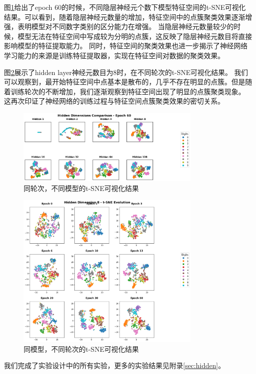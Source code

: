 \documentclass[12pt,a4paper]{article}
\begin{document}
图\ref{fig:60}给出了epoch 60的时候，不同隐层神经元个数下模型特征空间的t-SNE可视化结果。可以看到，随着隐层神经元数量的增加，特征空间中的点簇聚类效果逐渐增强，表明模型对不同数字类别的区分能力在增强。
当隐层神经元数量较少的时候，模型无法在特征空间中写成较为分明的点簇，这反映了隐层神经元数目将直接影响模型的特征提取能力。
同时，特征空间的聚类效果也进一步揭示了神经网络学习能力的来源是训练特征提取器，实现在特征空间对数据的聚类效果。

图\ref{fig:8}展示了hidden layer神经元数目为8时，在不同轮次的t-SNE可视化结果。
我们可以观察到，最开始特征空间中点基本是散布的，几乎不存在明显的点簇。但是随着训练轮次的不断增加，我们逐渐观察到特征空间出现了明显的点簇聚类现象。
这再次印证了神经网络的训练过程与特征空间点簇聚类效果的密切关系。
\begin{figure}[H]
    \centering
    \includegraphics[width=0.8\textwidth]{../images/pa/tsne_comparison_epoch_60.png}
    \caption{同轮次，不同模型的t-SNE可视化结果}
    \label{fig:60}
\end{figure}

\begin{figure}[H]
    \centering
    \includegraphics[width=0.8\textwidth]{../images/pa/tsne_evolution_hidden_8.png}
    \caption{同模型，不同轮次的t-SNE可视化结果}
    \label{fig:8}
\end{figure}
我们完成了实验设计中的所有实验，更多的实验结果见附录\ref{sec:hidden}。
\end{document}
